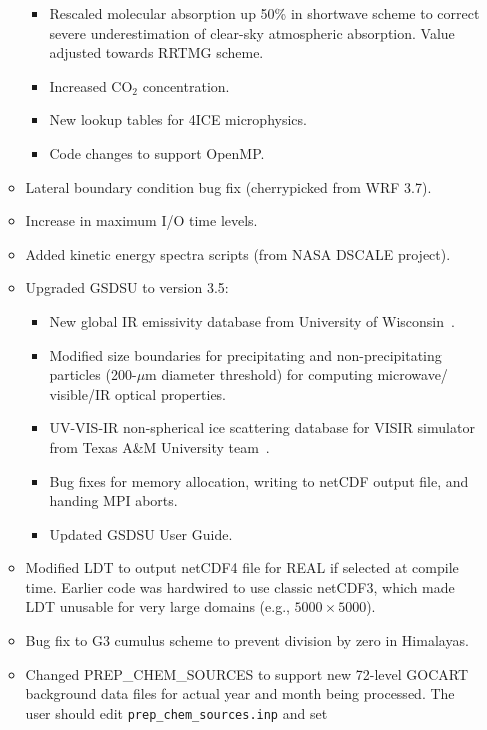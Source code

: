 \begin{itemize}
\begin{itemize}
      \begin{itemize}
        \item Rescaled molecular absorption up 50\% in shortwave scheme to 
          correct severe underestimation of clear-sky atmospheric absorption.
          Value adjusted towards RRTMG scheme.
        \item Increased CO$_2$ concentration.
        \item New lookup tables for 4ICE microphysics.
        \item Code changes to support OpenMP.          
      \end{itemize}
    \item Lateral boundary condition bug fix (cherrypicked from WRF 3.7).
    \item Increase in maximum I/O time levels.
    \item Added kinetic energy spectra scripts (from NASA DSCALE project).
    \item Upgraded GSDSU to version 3.5:
      \begin{itemize}
        \item New global IR emissivity database from University of 
          Wisconsin~\citep{ref:SeemannEtAl2008}.
        \item Modified size boundaries for precipitating and non-precipitating
          particles (200-$\mu$m diameter threshold) for computing microwave/
          visible/IR optical properties.
        \item UV-VIS-IR non-spherical ice scattering database for VISIR 
          simulator from Texas A\&M University team~\citep{ref:YangEtAl2013}.
        \item Bug fixes for memory allocation, writing to netCDF output file,
          and handing MPI aborts.
        \item Updated GSDSU User Guide.
      \end{itemize}
    \item Modified LDT to output netCDF4 file for REAL if selected at compile
      time. Earlier code was hardwired to use classic netCDF3, which made LDT
      unusable for very large domains (e.g., $5000\times5000$).
    \item Bug fix to G3 cumulus scheme to prevent division by zero in 
      Himalayas.
    \item Changed PREP\_CHEM\_SOURCES to support new 72-level GOCART 
      background data files for actual year and month being processed.  The 
      user should edit \texttt{prep\_chem\_sources.inp} and set 

\end{itemize}
\end{itemize}
